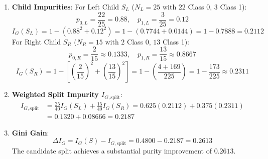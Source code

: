 \begin{enumerate}
\begin{enumerate}[label=(\alph*)]
        \item \textbf{Child Impurities}:
        For Left Child $S_L$ ($N_L = 25$ with $22$ Class 0, $3$ Class 1):
        \begin{equation*}
        p_{0,L} = \frac{22}{25} = 0.88, \quad p_{1,L} = \frac{3}{25} = 0.12
        \end{equation*}
        \begin{equation*}
        I_G(S_L) = 1 - \left( 0.88^2 + 0.12^2 \right) = 1 - (0.7744 + 0.0144) = 1 - 0.7888 = \mathbf{0.2112}
        \end{equation*}
        For Right Child $S_R$ ($N_R = 15$ with $2$ Class 0, $13$ Class 1):
        \begin{equation*}
        p_{0,R} = \frac{2}{15} \approx 0.1333, \quad p_{1,R} = \frac{13}{15} \approx 0.8667
        \end{equation*}
        \begin{equation*}
        I_G(S_R) = 1 - \left[ \left(\frac{2}{15}\right)^2 + \left(\frac{13}{15}\right)^2 \right] = 1 - \left( \frac{4 + 169}{225} \right) = 1 - \frac{173}{225} \approx \mathbf{0.2311}
        \end{equation*}

        \item \textbf{Weighted Split Impurity $I_{G,\text{split}}$}:
        \begin{align*}
        I_{G,\text{split}} &= \frac{25}{40} I_G(S_L) + \frac{15}{40} I_G(S_R) = 0.625(0.2112) + 0.375(0.2311) \\
        &= 0.1320 + 0.08666 = \mathbf{0.2187}
        \end{align*}

        \item \textbf{Gini Gain}:
        \begin{equation*}
        \Delta I_G = I_G(S) - I_{G,\text{split}} = 0.4800 - 0.2187 = \mathbf{0.2613}
        \end{equation*}
        The candidate split achieves a substantial purity improvement of $0.2613$.
    \end{enumerate}
\end{enumerate}
